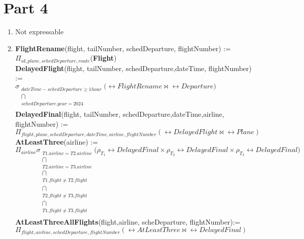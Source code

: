 \section{Part 4}


\begin{enumerate}[label=\textbf{\arabic*.}]
\item
Not expressable

\item \textbf{FlightRename}(flight, tailNumber, schedDeparture, flightNumber) := $\Pi_{id, plane, schedDeparture,route}$(\textbf{Flight}) \\

\textbf{DelayedFlight}(flight, tailNumber, schedDeparture,dateTime, flightNumber) := \\
$\sigma_{\substack{dateTime - schedDeparture \geq 1 hour\\
\bigcap  \\
schedDeparture.year = 2024\\}}\Bigg(\rel{FlightRename} \bowtie \rel{Departure}\Bigg)$\\

\textbf{DelayedFinal}(flight, tailNumber, schedDeparture,dateTime,airline, flightNumber) := \\$\Pi_{flight, plane, schedDeparture,dateTime, airline, flightNumber}(\rel{DelayedFlight} \bowtie \rel{Plane})$\\

\textbf{AtLeastThree}(airline) := $\Pi_{airline}\sigma_{\substack{T1.airline=T2.airline \\ \bigcap \\ T2.airline=T3.airline \\ \bigcap \\ T1.flight \neq T2.flight \\ \bigcap \\ T2.flight \neq T3.flight \\ \bigcap \\ T1.flight \neq T3.flight \\}}\Bigg(\rho_{T_1} \rel{DelayedFinal} \times \rho_{T_2} \rel{DelayedFinal} \times \rho_{T_3} \rel{DelayedFinal}\Bigg)$\\

\textbf{AtLeastThreeAllFlights}(flight,airline, scheDeparture, flightNumber):=\\$\Pi_{flight, airline, schedDeparture, flightNumber}(\rel{AtLeastThree} \bowtie \rel{DelayedFinal})$\\


\end{enumerate}
